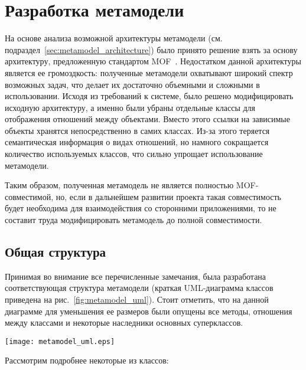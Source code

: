 \section{Разработка метамодели}

На основе анализа возможной архитектуры метамодели (см.
подраздел~\ref{sec:metamodel_architecture}) было принято решение взять за
основу архитектуру, предложенную стандартом MOF~\cite{mof}. Недостатком данной
архитектуры является ее громоздкость: полученные метамодели охватывают широкий
спектр возможных задач, что делает их достаточно объемными и сложными в
использовании. Исходя из требований к системе, было решено модифицировать
исходную архитектуру, а именно были убраны отдельные классы для отображения
отношений между объектами. Вместо этого ссылки на зависимые объекты хранятся
непосредственно в самих классах. Из-за этого теряется семантическая информация о
видах отношений, но намного сокращается количество используемых классов, что
сильно упрощает использование метамодели.

Таким образом, полученная метамодель не является полностью MOF-совместимой, но,
если в дальнейшем развитии проекта такая совместимость будет необходима для
взаимодействия со сторонними приложениями, то не составит труда модифицировать
метамодель до полной совместимости.

\subsection{Общая структура}

Принимая во внимание все перечисленные замечания, была разработана
соответствующая структура метамодели (краткая UML-диаграмма классов приведена на
рис.~\ref{fig:metamodel_uml}). Стоит отметить, что на данной диаграмме для
уменьшения ее размеров были опущены все методы, отношения между классами и
некоторые наследники основных суперклассов.

\begin{sidewaysfigure}[!htbp]
    \begin{center}
        \texttt{[image: metamodel\_uml.eps]}
    \end{center}
    \caption{Упрощенная диаграмма классов метамодели}
    \label{fig:metamodel_uml}
\end{sidewaysfigure}

\newpage
Рассмотрим подробнее некоторые из классов:

